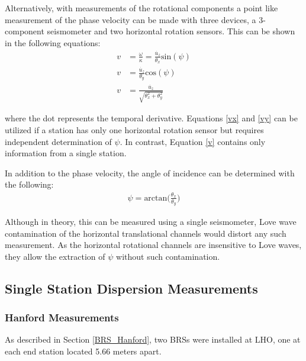 \documentclass [12pt, proquest]{uwthesis}[2019]
\begin{document}
Alternatively, with measurements of the rotational components a point like measurement of the phase velocity can be made with three devices, a 3-component seismometer and two horizontal rotation sensors. This can be shown in the following equations:
\begin{align} 
v&=\frac{\omega}{\kappa} = \frac{\dot{u_z}}{\theta_x}\text{sin}(\psi) \label{vx} \\
v&=\frac{\dot{u_z}}{\theta_y}\text{cos}(\psi)\label{vy} \\
v&=\frac{\dot{u_z}}{\sqrt{\theta_x^2+\theta_y^2}} \label{v}
\end{align}

where the dot represents the temporal derivative. Equations \ref{vx} and \ref{vy} can be utilized if a station has only one horizontal rotation sensor but requires independent determination of $\psi$. In contrast, Equation \ref{v} contains only information from a single station.

In addition to the phase velocity, the angle of incidence can be determined with the following:
\begin{align}
\psi=\text{arctan}\bigg(\frac{\theta_x}{\theta_y}\bigg)
\end{align}

Although in theory, this can be measured using a single seismometer, Love wave contamination of the horizontal translational channels would distort any such measurement. As the horizontal rotational channels are insensitive to Love waves, they allow the extraction of $\psi$ without such contamination.  

\subsection{Single Station Dispersion Measurements}
\subsubsection{Hanford Measurements}
As described in Section \ref{BRS_Hanford}, two BRSs were installed at LHO, one at each end station located 5.66 meters apart. 
 
\end{document}
